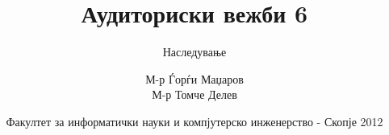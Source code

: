 

\author[АВ6]{М-р Ѓорѓи Маџаров\\М-р Томче Делев}
\title[Објектно ориентирано програмирање]{Аудиториски вежби 6}
\subtitle{Наследување}
\date{Факултет за информатички науки и компјутерско инженерство - Скопје 2012}





\frame[t,plain]{\titlepage}






